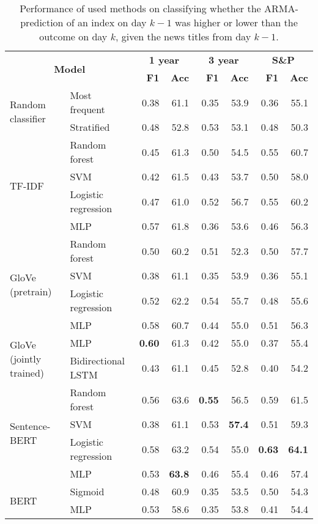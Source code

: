 \begin{table}[H]
    \centering
    \begin{tabular}{llrrrrrr}
    \hline
        \multicolumn{2}{c}{\multirow{2}{*}{\textbf{Model}}} & \multicolumn{2}{c}{\textbf{1 year}} & \multicolumn{2}{c}{\textbf{3 year}} & \multicolumn{2}{c}{\textbf{S\&P}} \\
      & & \textbf{F1} & \textbf{Acc} & \textbf{F1} & \textbf{Acc} & \textbf{F1} & \textbf{Acc} \\
        \hline \hline   
        \multirow{2}{*}{Random classifier} & Most frequent & 0.38 & 61.1 & 0.35 & 53.9 & 0.36 & 55.1 \\
        & Stratified & 0.48 & 52.8 & 0.53 & 53.1 & 0.48 & 50.3 \\
        \hline 
        \multirow{4}{*}{TF-IDF} & Random forest & 0.45 & 61.3 & 0.50 & 54.5 & 0.55 & 60.7 \\
        & SVM & 0.42 & 61.5 & 0.43 & 53.7 & 0.50 & 58.0 \\
        & Logistic regression & 0.47 & 61.0 & 0.52 & 56.7 & 0.55 & 60.2 \\
        & MLP & 0.57 & 61.8 & 0.36 & 53.6 & 0.46 & 56.3 \\
        \hline 
        \multirow{4}{*}{GloVe (pretrain)} & Random forest & 0.50 & 60.2 & 0.51 & 52.3 & 0.50 & 57.7 \\
        & SVM & 0.38 & 61.1 & 0.35 & 53.9 & 0.36 & 55.1 \\
        & Logistic regression & 0.52 & 62.2 & 0.54 & 55.7 & 0.48 & 55.6  \\
        & MLP & 0.58 & 60.7 & 0.44 & 55.0 & 0.51 & 56.3 \\
        \hline 
        \multirow{2}{*}{GloVe (jointly trained)} & MLP & \textbf{0.60} & 61.3 & 0.42 & 55.0 & 0.37 & 55.4 \\
        & Bidirectional LSTM & 0.43 & 61.1 & 0.45 & 52.8 & 0.40 & 54.2 \\
        \hline 
        \multirow{4}{*}{Sentence-BERT} & Random forest & 0.56 & 63.6 & \textbf{0.55} & 56.5 & 0.59 & 61.5 \\
        & SVM & 0.38 & 61.1 & 0.53 & \textbf{57.4} & 0.51 & 59.3 \\
        & Logistic regression & 0.58 & 63.2 & 0.54 & 55.0 & \textbf{0.63} & \textbf{64.1} \\
        & MLP & 0.53 & \textbf{63.8} & 0.46 & 55.4 & 0.46 & 57.4 \\
        \hline
        \multirow{2}{*}{BERT} & Sigmoid & 0.48 & 60.9 & 0.35 & 53.5 & 0.50 & 54.3  \\
        & MLP & 0.53 & 58.6 & 0.35 & 53.8 & 0.41 & 54.4 \\ 
        \hline
    \end{tabular}
\caption{Performance of used methods on classifying whether the ARMA-prediction of an index on day $k-1$ was higher or lower than the outcome on day $k$, given the news titles from day $k-1$.}
\label{tab:res_arma_ndp}
\end{table}

